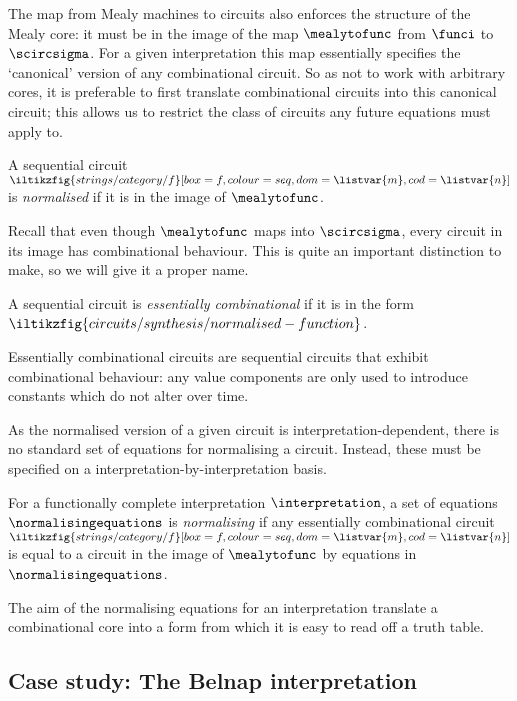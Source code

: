 The map from Mealy machines to circuits also enforces the structure of the
Mealy core: it must be in the image of the map \(\mealytofunc\) from \(\funci\)
to \(\scircsigma\).
For a given interpretation this map essentially specifies the `canonical'
version of any combinational circuit.
So as not to work with arbitrary cores, it is preferable to first translate
combinational circuits into this canonical circuit; this allows us to restrict
the class of circuits any future equations must apply to.

\begin{definition}
    A sequential circuit \(
    \iltikzfig{strings/category/f}[box=f,colour=seq,dom=\listvar{m},cod=\listvar{n}]
    \) is \emph{normalised} if it is in the image of \(\mealytofunc\).
\end{definition}

Recall that even though \(\mealytofunc\) maps into \(\scircsigma\), every
circuit in its image has combinational behaviour.
This is quite an important distinction to make, so we will give it a proper
name.

\begin{lemma}
    A sequential circuit is \emph{essentially combinational} if it is in the
    form \(
    \iltikzfig{circuits/synthesis/normalised-function}
    \).
\end{lemma}

Essentially combinational circuits are sequential circuits that exhibit
combinational behaviour: any value components are only used to introduce
constants which do not alter over time.

As the normalised version of a given circuit is interpretation-dependent, there
is no standard set of equations for normalising a circuit.
Instead, these must be specified on a interpretation-by-interpretation basis.

\begin{definition}
    For a functionally complete interpretation \(\interpretation\), a set of
    equations \(\normalisingequations\) is \emph{normalising} if any
    essentially combinational circuit \(
    \iltikzfig{strings/category/f}[box=f,colour=seq,dom=\listvar{m},cod=\listvar{n}]
    \) is equal to a circuit in the image of \(\mealytofunc\) by equations in
    \(\normalisingequations\).
\end{definition}

The aim of the normalising equations for an interpretation translate a
combinational core into a form from which it is easy to read off a truth table.

\subsection{Case study: The Belnap interpretation}\label{sec:algebraic-case-study}

